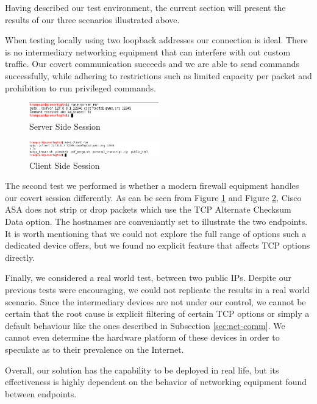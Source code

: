 
Having described our test environment, the current section will present the
results of our three scenarios illustrated above.

When testing locally using two loopback addresses our connection is ideal.
There is no intermediary networking equipment that can interfere with out
custom traffic. Our covert communication succeeds and we are able to send
commands successfully, while adhering to restrictions such as limited capacity
per packet and prohibition to run privileged commands.

\begin{figure}
  \centering
  \includegraphics[width=0.5\textwidth]{img/server-run}
  \caption{Server Side Session}
  \label{fig:server-run}
\end{figure}

\begin{figure}
  \centering
  \includegraphics[width=0.5\textwidth]{img/client-run}
  \caption{Client Side Session}
  \label{fig:client-run}
\end{figure}

The second test we performed is whether a modern firewall equipment handles
our covert session differently. As can be seen from Figure
\ref{fig:server-run} and Figure \ref{fig:client-run}, Cisco ASA does not strip
or drop packets which use the TCP Alternate Checksum Data option. The
hostnames are conveniantly set to illustrate the two endpoints. It is worth
mentioning that we could not explore the full range of options such a
dedicated device offers, but we found no explicit feature that affects TCP
options directly.

Finally, we considered a real world test, between two public IPs. Despite our
previous tests were encouraging, we could not replicate the results in a real
world scenario. Since the intermediary devices are not under our control, we
cannot be certain that the root cause is explicit filtering of certain TCP
options or simply a default behaviour like the ones described in Subsection
\ref{sec:net-comm}. We cannot even determine the hardware platform of these
devices in order to speculate as to their prevalence on the Internet.

Overall, our solution has the capability to be deployed in real life, but its
effectiveness is highly dependent on the behavior of networking equipment
found between endpoints.
